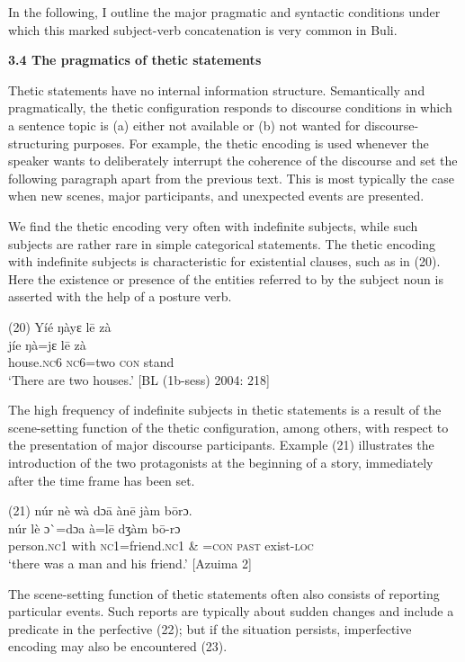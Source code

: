 \documentclass[output=paper]{langsci/langscibook}
\begin{document}
In the following, I outline the major pragmatic and syntactic conditions under which this marked subject-verb concatenation is very common in Buli.

\textbf{3.4 The pragmatics of thetic statements}

Thetic statements have no internal information structure. Semantically and pragmatically, the thetic configuration responds to discourse conditions in which a sentence topic is (a) either not available or (b) not wanted for discourse-structuring purposes. For example, the thetic encoding is used whenever the speaker wants to deliberately interrupt the coherence of the discourse and set the following paragraph apart from the previous text. This is most typically the case when new scenes, major participants, and unexpected events are presented. 

We find the thetic encoding very often with indefinite subjects, while such subjects are rather rare in simple categorical statements. The thetic encoding with indefinite subjects is characteristic for existential clauses, such as in (20). Here the existence or presence of the entities referred to by the subject noun is asserted with the help of a posture verb.

\gll \textup{(20)}  Yíé    ŋàyɛ    l\={e}  zà\\
\gll \textup{  jíe    ŋà=jɛ    l\={e}  zà }\\
       house.\textsc{nc}6  \textsc{nc}6=two  \textsc{con}  stand\\
\glt ‘There are two houses.’ [BL (1b-sess) 2004: 218]
\z

The high frequency of indefinite subjects in thetic statements is a result of the scene-setting function of the thetic configuration, among others, with respect to the presentation of major discourse participants. Example (21) illustrates the introduction of the two protagonists at the beginning of a story, immediately after the time frame has been set. 

\gll \textup{(21)}  núr    nè  wà   dɔ\={a}    àn\={e}    jàm  b\={o}rɔ.\\
\gll \textup{  núr    lè  }ɔ\`{ }\textup{=dɔa      à=l\={e}    dʒàm  b\={o}-rɔ}\\
       person.\textsc{nc}1  with  \textsc{nc}1=friend.\textsc{nc}1  \& =\textsc{con}  \textsc{past}  exist-\textsc{loc}\\
\glt ‘there was a man and his friend.’ [Azuima 2]
\z

The scene-setting function of thetic statements often also consists of reporting particular events. Such reports are typically about sudden changes and include a predicate in the perfective (22); but if the situation persists, imperfective encoding may also be encountered (23).
\end{document}
